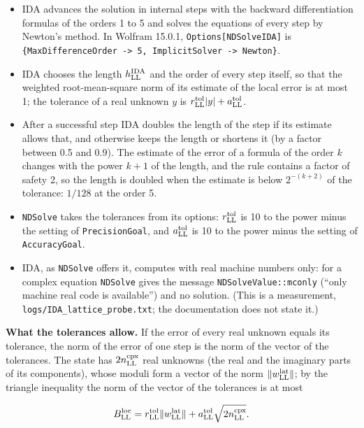\documentclass[
  10pt,
]{article}
\providecommand{\tightlist}{%
  \setlength{\itemsep}{0pt}\setlength{\parskip}{0pt}}
\begin{document}
\begin{itemize}
\tightlist
\item
  IDA advances the solution in internal steps with the backward
  differentiation formulas of the orders 1 to 5 and solves the equations
  of every step by Newton's method. In Wolfram 15.0.1,
  \texttt{Options{[}NDSolve\textasciigrave{}IDA{]}} is
  \texttt{\{MaxDifferenceOrder\ -\textgreater{}\ 5,\ ImplicitSolver\ -\textgreater{}\ Newton\}}.
\item
  IDA chooses the length \(h^{\rm IDA}_{\rm LL}\) and the order of every
  step itself, so that the weighted root-mean-square norm of its
  estimate of the local error is at most 1; the tolerance of a real
  unknown \(y\) is
  \(r^{\rm tol}_{\rm LL}\lvert y\rvert+a^{\rm tol}_{\rm LL}\).
\item
  After a successful step IDA doubles the length of the step if its
  estimate allows that, and otherwise keeps the length or shortens it
  (by a factor between 0.5 and 0.9). The estimate of the error of a
  formula of the order \(k\) changes with the power \(k+1\) of the
  length, and the rule contains a factor of safety 2, so the length is
  doubled when the estimate is below \(2^{-(k+2)}\) of the tolerance:
  \(1/128\) at the order 5.
\item
  \texttt{NDSolve} takes the tolerances from its options:
  \(r^{\rm tol}_{\rm LL}\) is 10 to the power minus the setting of
  \texttt{PrecisionGoal}, and \(a^{\rm tol}_{\rm LL}\) is 10 to the
  power minus the setting of \texttt{AccuracyGoal}.
\item
  IDA, as \texttt{NDSolve} offers it, computes with real machine numbers
  only: for a complex equation \texttt{NDSolve} gives the message
  \texttt{NDSolveValue::mconly} (``only machine real code is
  available'') and no solution. (This is a measurement,
  \texttt{logs/IDA\_lattice\_probe.txt}; the documentation does not
  state it.)
\end{itemize}

\textbf{What the tolerances allow.} If the error of every real unknown
equals its tolerance, the norm of the error of one step is the norm of
the vector of the tolerances. The state has \(2n^{\rm cpx}_{\rm LL}\)
real unknowns (the real and the imaginary parts of its components),
whose moduli form a vector of the norm
\(\lVert w^{\rm lat}_{\rm LL}\rVert\); by the triangle inequality the
norm of the vector of the tolerances is at most

\[B^{\rm loc}_{\rm LL}=r^{\rm tol}_{\rm LL}\lVert w^{\rm lat}_{\rm LL}\rVert+a^{\rm tol}_{\rm LL}\sqrt{2n^{\rm cpx}_{\rm LL}}.\]
\end{document}
